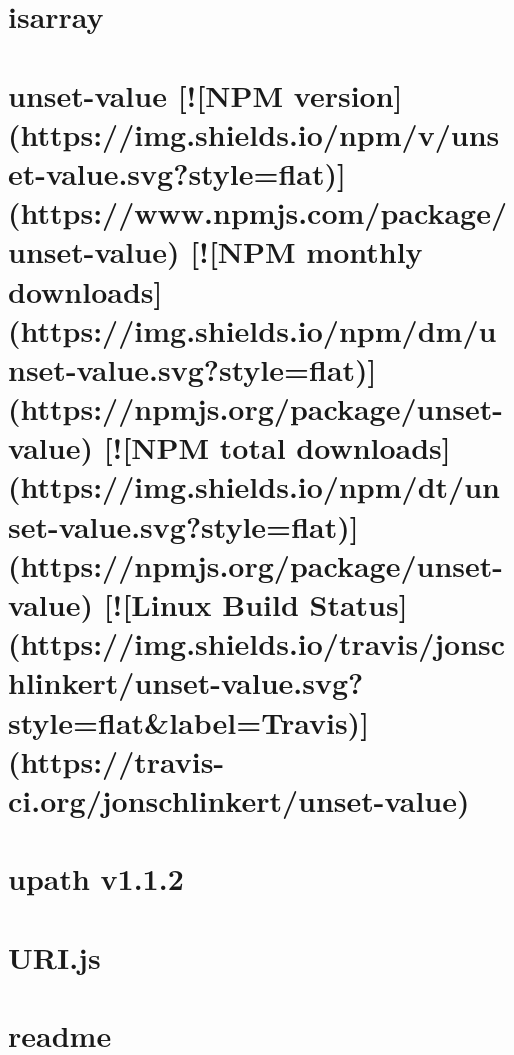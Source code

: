 \documentclass[twoside]{book}
\newcommand{\+}{\discretionary{\mbox{\scriptsize$\hookleftarrow$}}{}{}}
\begin{document}
\chapter{isarray}
\label{md_dsmacc_vis_degree_node_modules_unset-value_node_modules_isarray_README}

\chapter{unset-\/value \mbox{[}!\mbox{[}N\+PM version\mbox{]}(https\+://img.shields.\+io/npm/v/unset-\/value.svg?style=flat)\mbox{]}(https\+://www.npmjs.\+com/package/unset-\/value) \mbox{[}!\mbox{[}N\+PM monthly downloads\mbox{]}(https\+://img.shields.\+io/npm/dm/unset-\/value.svg?style=flat)\mbox{]}(https\+://npmjs.org/package/unset-\/value) \mbox{[}!\mbox{[}N\+PM total downloads\mbox{]}(https\+://img.shields.\+io/npm/dt/unset-\/value.svg?style=flat)\mbox{]}(https\+://npmjs.org/package/unset-\/value) \mbox{[}!\mbox{[}Linux Build Status\mbox{]}(https\+://img.shields.\+io/travis/jonschlinkert/unset-\/value.svg?style=flat\&label=Travis)\mbox{]}(https\+://travis-\/ci.org/jonschlinkert/unset-\/value)}
\label{md_dsmacc_vis_degree_node_modules_unset-value_README}

\chapter{upath v1.1.2}
\label{md_dsmacc_vis_degree_node_modules_upath_readme}

\chapter{U\+R\+I.\+js}
\label{md_dsmacc_vis_degree_node_modules_uri-js_README}

\chapter{readme}
\label{md_dsmacc_vis_degree_node_modules_urix_readme}

\end{document}
